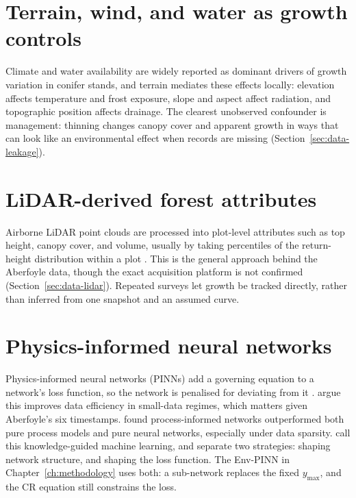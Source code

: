 \section{Terrain, wind, and water as growth controls}

Climate and water availability are widely reported as dominant drivers of growth variation in conifer stands, and terrain mediates these effects locally: elevation affects temperature and frost exposure, slope and aspect affect radiation, and topographic position affects drainage. The clearest unobserved confounder is management: thinning changes canopy cover and apparent growth in ways that can look like an environmental effect when records are missing (Section~\ref{sec:data-leakage}).

\section{LiDAR-derived forest attributes}

Airborne LiDAR point clouds are processed into plot-level attributes such as top height, canopy cover, and volume, usually by taking percentiles of the return-height distribution within a plot \citep{tompalski2021EstimatingChangesForest}. This is the general approach behind the Aberfoyle data, though the exact acquisition platform is not confirmed (Section~\ref{sec:data-lidar}). Repeated surveys let growth be tracked directly, rather than inferred from one snapshot and an assumed curve.

\section{Physics-informed neural networks}

Physics-informed neural networks (PINNs) add a governing equation to a network's loss function, so the network is penalised for deviating from it \citep{raissi2019PhysicsinformedNeuralNetworks}. \citet{karniadakis2021PhysicsinformedMachineLearning} argue this improves data efficiency in small-data regimes, which matters given Aberfoyle's six timestamps. \citet{wesselkamp2024ProcessInformedNeuralNetworks} found process-informed networks outperformed both pure process models and pure neural networks, especially under data sparsity. \citet{jin2026KnowledgeGuidedMachine} call this knowledge-guided machine learning, and separate two strategies: shaping network structure, and shaping the loss function. The Env-PINN in Chapter~\ref{ch:methodology} uses both: a sub-network replaces the fixed $y_{\max}$, and the CR equation still constrains the loss.

